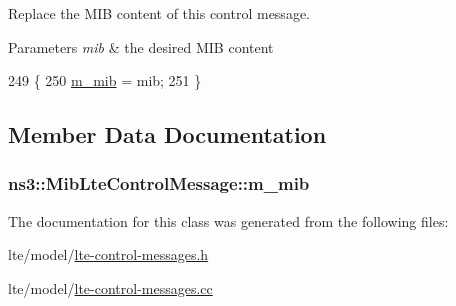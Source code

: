Replace the M\+IB content of this control message. 


\begin{DoxyParams}{Parameters}
{\em mib} & the desired M\+IB content \\
\hline
\end{DoxyParams}

\begin{DoxyCode}
249 \{
250   \hyperlink{classns3_1_1MibLteControlMessage_a5de9d1b36c48aa78c159fc7ee12ef64f}{m\_mib} = mib;
251 \}
\end{DoxyCode}


\subsection{Member Data Documentation}
\subsubsection[{\texorpdfstring{m\+\_\+mib}{m_mib}}]{ ns3\+::\+Mib\+Lte\+Control\+Message\+::m\+\_\+mib\hspace{0.3cm}{\ttfamily [private]}}\hypertarget{classns3_1_1MibLteControlMessage_a5de9d1b36c48aa78c159fc7ee12ef64f}{}\label{classns3_1_1MibLteControlMessage_a5de9d1b36c48aa78c159fc7ee12ef64f}


The documentation for this class was generated from the following files\+:\begin{DoxyCompactItemize}
\item 
lte/model/\hyperlink{lte-control-messages_8h}{lte-\/control-\/messages.\+h}\item 
lte/model/\hyperlink{lte-control-messages_8cc}{lte-\/control-\/messages.\+cc}\end{DoxyCompactItemize}
